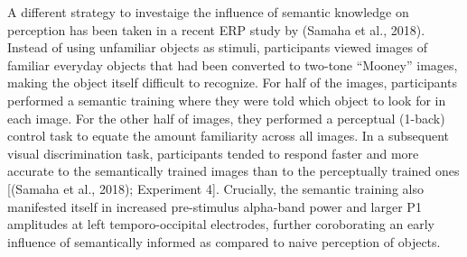 \documentclass[
  english,
  man,11pt,floatsintext]{apa7}
\begin{document}
A different strategy to investaige the influence of semantic knowledge on perception has been taken in a recent ERP study by (Samaha et al., 2018). Instead of using unfamiliar objects as stimuli, participants viewed images of familiar everyday objects that had been converted to two-tone ``Mooney'' images, making the object itself difficult to recognize. For half of the images, participants performed a semantic training where they were told which object to look for in each image. For the other half of images, they performed a perceptual (1-back) control task to equate the amount familiarity across all images. In a subsequent visual discrimination task, participants tended to respond faster and more accurate to the semantically trained images than to the perceptually trained ones {[}(Samaha et al., 2018); Experiment 4{]}. Crucially, the semantic training also manifested itself in increased pre-stimulus alpha-band power and larger P1 amplitudes at left temporo-occipital electrodes, further coroborating an early influence of semantically informed as compared to naive perception of objects.
\end{document}

